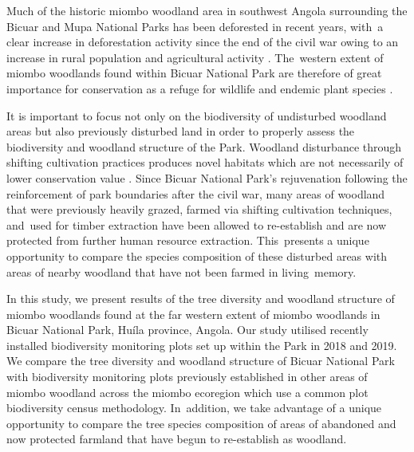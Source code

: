\documentclass[diversity,article,accept,moreauthors,pdftex]{Definitions/mdpi}
\begin{document}
Much of the historic miombo woodland area in southwest Angola surrounding the Bicuar and Mupa National Parks has been deforested in recent years, with~a clear increase in deforestation activity since the end of the civil war owing to an increase in rural population and agricultural activity \citep{Schneibel2013, Huntley2019}. The~western extent of miombo woodlands found within Bicuar National Park are therefore of great importance for conservation as a refuge for wildlife and endemic plant species \citep{Huntley2019}.

It is important to focus not only on the biodiversity of undisturbed woodland areas but also previously disturbed land in order to properly assess the biodiversity and woodland structure of the Park. Woodland disturbance through shifting cultivation practices produces novel habitats which are not necessarily of lower conservation value \citep{McNicol2015, Goncalves2017}. Since Bicuar National Park's rejuvenation following the reinforcement of park boundaries after the civil war, many areas of woodland that were previously heavily grazed, farmed via shifting cultivation techniques, and~used for timber extraction have been allowed to re-establish and are now protected from further human resource extraction. This~presents a unique opportunity to compare the species composition of these disturbed areas with areas of nearby woodland that have not been farmed in living~memory.

In this study, we present results of the tree diversity and woodland structure of miombo woodlands found at the far western extent of miombo woodlands in Bicuar National Park, Hu\'{i}la province, Angola. Our study utilised recently installed biodiversity monitoring plots set up within the Park in 2018 and 2019. We compare the tree diversity and woodland structure of Bicuar National Park with biodiversity monitoring plots previously established in other areas of miombo woodland across the miombo ecoregion which use a common plot biodiversity census methodology. In~addition, we take advantage of a unique opportunity to compare the tree species composition of areas of abandoned and now protected farmland that have begun to re-establish as woodland. 

\end{document}
